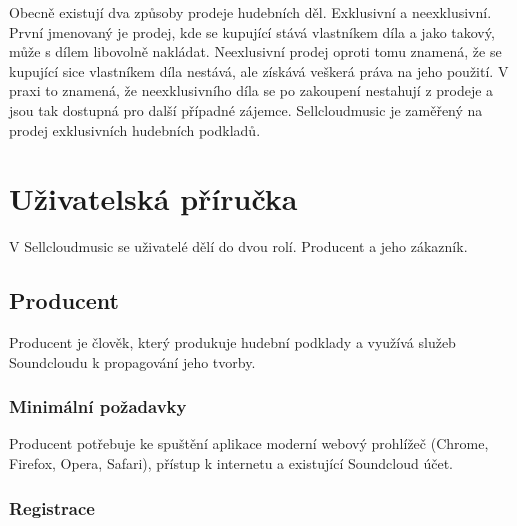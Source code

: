 \documentclass[12pt]{article}
\begin{document}
Obecně existují dva způsoby prodeje hudebních děl. Exklusivní a neexklusivní. První jmenovaný je prodej, kde se kupující stává vlastníkem díla a jako takový, může s dílem libovolně nakládat. Neexlusivní prodej oproti tomu znamená, že se kupující sice vlastníkem díla nestává, ale získává veškerá práva na jeho použití. V praxi to znamená, že neexklusivního díla se po zakoupení nestahují z prodeje a jsou tak dostupná pro další případné zájemce. 
Sellcloudmusic je zaměřený na prodej exklusivních hudebních podkladů.

\newpage

\section{Uživatelská příručka}

V Sellcloudmusic se uživatelé dělí do dvou rolí. Producent a jeho zákazník.

\subsection{Producent}

Producent je člověk, který produkuje hudební podklady a využívá služeb Soundcloudu k propagování jeho tvorby.

\subsubsection{Minimální požadavky}
Producent potřebuje ke spuštění aplikace moderní webový prohlížeč (Chrome, Firefox, Opera, Safari), přístup k internetu a existující Soundcloud účet.

\subsubsection{Registrace} \label{reg}
\end{document}
